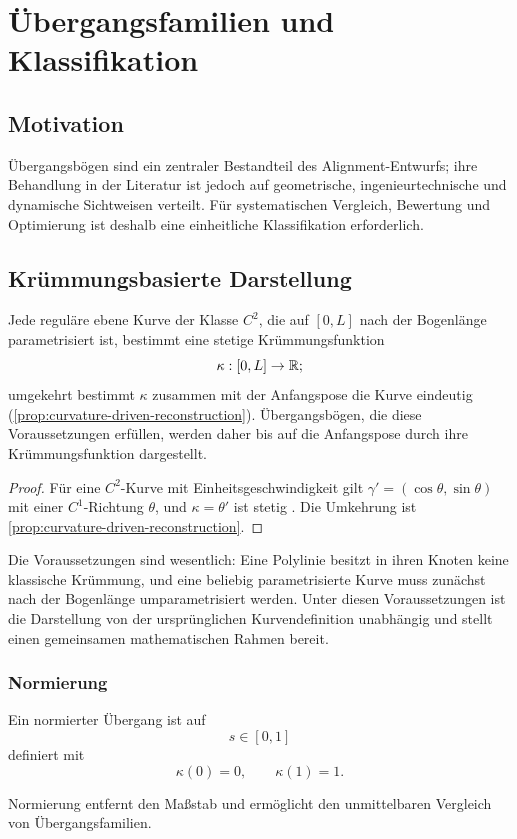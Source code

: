 \chapter{Übergangsfamilien und Klassifikation}

\section*{Motivation}
Übergangsbögen sind ein zentraler Bestandteil des Alignment-Entwurfs; ihre
Behandlung in der Literatur ist jedoch auf geometrische, ingenieurtechnische
und dynamische Sichtweisen verteilt. Für systematischen Vergleich, Bewertung
und Optimierung ist deshalb eine einheitliche Klassifikation erforderlich.

\section{Krümmungsbasierte Darstellung}
\begin{proposition}
\label{prop:transition-curvature-representation}
Jede reguläre ebene Kurve der Klasse \(C^2\), die auf \([0,L]\) nach der
Bogenlänge parametrisiert ist, bestimmt eine stetige Krümmungsfunktion
\[
\kappa:[0,L]\to\mathbb{R} ;
\]
umgekehrt bestimmt \(\kappa\) zusammen mit der Anfangspose die Kurve
eindeutig (\cref{prop:curvature-driven-reconstruction}). Übergangsbögen,
die diese Voraussetzungen erfüllen, werden daher bis auf die Anfangspose
durch ihre Krümmungsfunktion dargestellt.
\end{proposition}
\begin{proof}
Für eine \(C^2\)-Kurve mit Einheitsgeschwindigkeit gilt
\(\gamma'=(\cos\theta,\sin\theta)\) mit einer \(C^1\)-Richtung \(\theta\),
und \(\kappa=\theta'\) ist stetig \cite{DoCarmo1976Curves}. Die Umkehrung
ist \cref{prop:curvature-driven-reconstruction}.
\end{proof}
Die Voraussetzungen sind wesentlich: Eine Polylinie besitzt in ihren
Knoten keine klassische Krümmung, und eine beliebig parametrisierte Kurve
muss zunächst nach der Bogenlänge umparametrisiert werden. Unter diesen
Voraussetzungen ist die Darstellung von der ursprünglichen Kurvendefinition
unabhängig und stellt einen gemeinsamen mathematischen Rahmen bereit.

\subsection{Normierung}
\begin{definition}
Ein normierter Übergang ist auf
\[
s\in[0,1]
\]
definiert mit
\[
\kappa(0)=0,\qquad\kappa(1)=1.
\]
\end{definition}
Normierung entfernt den Maßstab und ermöglicht den unmittelbaren Vergleich von
Übergangsfamilien.

